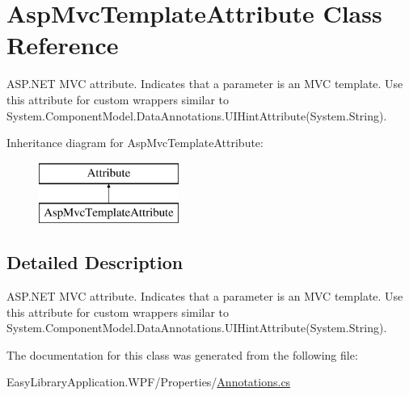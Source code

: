 \hypertarget{class_asp_mvc_template_attribute}{}\section{Asp\+Mvc\+Template\+Attribute Class Reference}
\label{class_asp_mvc_template_attribute}


A\+S\+P.\+N\+ET M\+VC attribute. Indicates that a parameter is an M\+VC template. Use this attribute for custom wrappers similar to {\ttfamily System.\+Component\+Model.\+Data\+Annotations.\+U\+I\+Hint\+Attribute(System.\+String)}.  


Inheritance diagram for Asp\+Mvc\+Template\+Attribute\+:\begin{figure}[H]
\begin{center}
\leavevmode
\includegraphics[height=2.000000cm]{class_asp_mvc_template_attribute}
\end{center}
\end{figure}


\subsection{Detailed Description}
A\+S\+P.\+N\+ET M\+VC attribute. Indicates that a parameter is an M\+VC template. Use this attribute for custom wrappers similar to {\ttfamily System.\+Component\+Model.\+Data\+Annotations.\+U\+I\+Hint\+Attribute(System.\+String)}. 



The documentation for this class was generated from the following file\+:\begin{DoxyCompactItemize}
\item 
Easy\+Library\+Application.\+W\+P\+F/\+Properties/\mbox{\hyperlink{_annotations_8cs}{Annotations.\+cs}}\end{DoxyCompactItemize}
